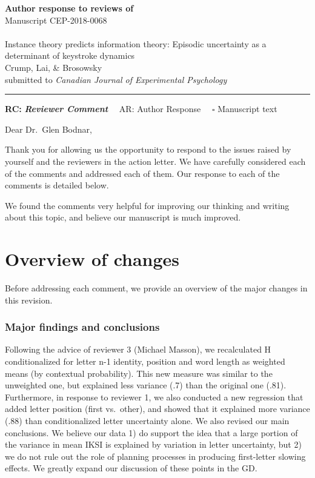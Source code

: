 \documentclass[draft]{article}
\begin{document}
{\Large\bf Author response to reviews of}\\[1em]
Manuscript CEP-2018-0068\\ \\
{\Large Instance theory predicts information theory: Episodic uncertainty as a determinant of keystroke dynamics}\\[1em]
{Crump, Lai, \& Brosowsky}\\
{submitted to \it Canadian Journal of Experimental Psychology }\\
\hrule

\hfill {\bfseries RC:} \textbf{\textit{Reviewer Comment}}\(\quad\) AR: Author Response \(\quad\square\) Manuscript text

\vspace{2em}

Dear Dr.~Glen Bodnar,

Thank you for allowing us the opportunity to respond to the issues raised by yourself and the reviewers in the action letter. We have carefully considered each of the comments and addressed each of them. Our response to each of the comments is detailed below.

We found the comments very helpful for improving our thinking and writing about this topic, and believe our manuscript is much improved.

\hypertarget{overview-of-changes}{%
\section{Overview of changes}\label{overview-of-changes}}

Before addressing each comment, we provide an overview of the major changes in this revision.

\hypertarget{major-findings-and-conclusions}{%
\subsubsection{Major findings and conclusions}\label{major-findings-and-conclusions}}

Following the advice of reviewer 3 (Michael Masson), we recalculated H conditionalized for letter n-1 identity, position and word length as weighted means (by contextual probability). This new measure was similar to the unweighted one, but explained less variance (.7) than the original one (.81). Furthermore, in response to reviewer 1, we also conducted a new regression that added letter position (first vs.~other), and showed that it explained more variance (.88) than conditionalized letter uncertainty alone. We also revised our main conclusions. We believe our data 1) do support the idea that a large portion of the variance in mean IKSI is explained by variation in letter uncertainty, but 2) we do not rule out the role of planning processes in producing first-letter slowing effects. We greatly expand our discussion of these points in the GD.
\end{document}
